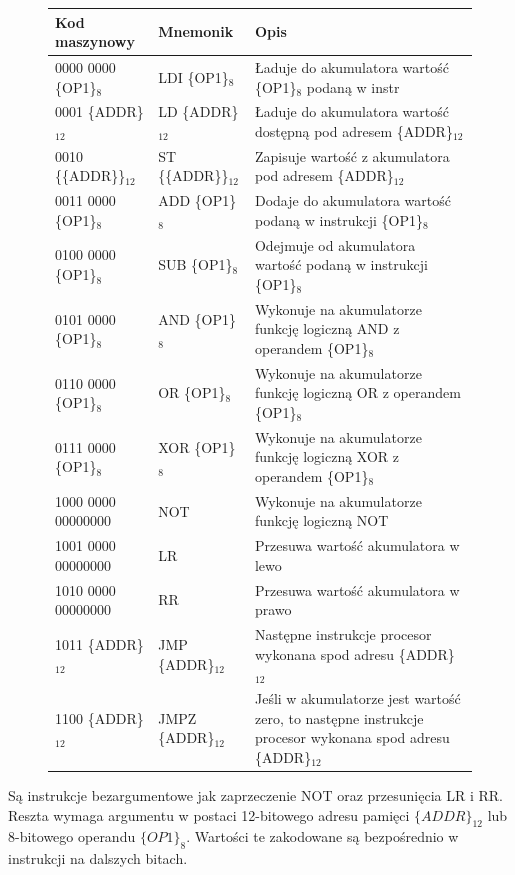 \documentclass[a4paper,12pt]{article}
\begin{document}
\begin{figure}[htb]
  \centering
\begin{tabular}{ | l | l | p{10cm} | }
  \hline
  Kod maszynowy  & Mnemonik & Opis \\ \hline
  0000 0000 \{OP1\}$_8$  & LDI \{OP1\}$_8$     & Ładuje do akumulatora wartość \{OP1\}$_8$ podaną w instr \\ \hline
  0001 \{ADDR\}$_{12}$   & LD \{ADDR\}$_{12}$ & Ładuje do akumulatora wartość dostępną pod adresem \{ADDR\}$_{12}$ \\ \hline
  0010 \{\{ADDR\}\}$_{12}$   & ST \{\{ADDR\}\}$_{12}$ & Zapisuje wartość z akumulatora pod adresem \{ADDR\}$_{12}$ \\ \hline
  0011 0000 \{OP1\}$_8$  & ADD \{OP1\}$_8$  & Dodaje do akumulatora wartość podaną w instrukcji \{OP1\}$_8$ \\ \hline
  0100 0000 \{OP1\}$_8$  & SUB \{OP1\}$_8$  & Odejmuje od akumulatora wartość podaną w instrukcji \{OP1\}$_8$ \\ \hline
  0101 0000 \{OP1\}$_8$  & AND \{OP1\}$_8$  & Wykonuje na akumulatorze funkcję logiczną AND z operandem \{OP1\}$_8$ \\ \hline
  0110 0000 \{OP1\}$_8$  & OR  \{OP1\}$_8$  & Wykonuje na akumulatorze funkcję logiczną OR  z operandem \{OP1\}$_8$ \\ \hline
  0111 0000 \{OP1\}$_8$  & XOR \{OP1\}$_8$  & Wykonuje na akumulatorze funkcję logiczną XOR z operandem \{OP1\}$_8$ \\ \hline
  1000 0000 00000000 & NOT          & Wykonuje na akumulatorze funkcję logiczną NOT \\ \hline
  1001 0000 00000000 & LR           & Przesuwa wartość akumulatora w lewo \\ \hline
  1010 0000 00000000 & RR           & Przesuwa wartość akumulatora w prawo \\ \hline
  1011 \{ADDR\}$_{12}$ & JMP  \{ADDR\}$_{12}$ & Następne instrukcje procesor wykonana spod adresu \{ADDR\}$_{12}$ \\ \hline
  1100 \{ADDR\}$_{12}$ & JMPZ \{ADDR\}$_{12}$ & Jeśli w akumulatorze jest wartość zero, to następne instrukcje procesor wykonana spod adresu \{ADDR\}$_{12}$ \\ \hline
\end{tabular}
\end{figure}


Są instrukcje bezargumentowe jak zaprzeczenie NOT oraz przesunięcia LR i RR. Reszta wymaga argumentu w postaci 12-bitowego adresu pamięci $\{ADDR\}_{12}$ lub 8-bitowego operandu $\{OP1\}_8$. Wartości te zakodowane są bezpośrednio w instrukcji na dalszych bitach.
\end{document}
